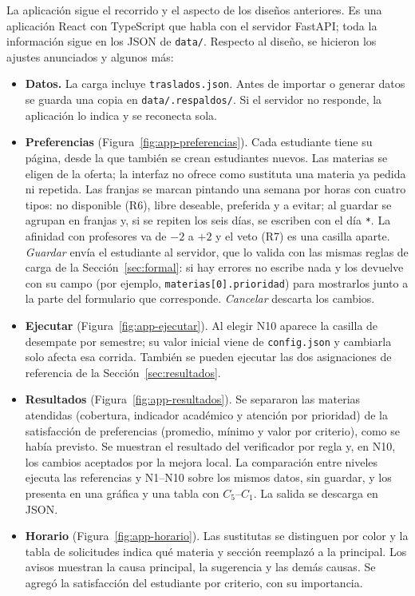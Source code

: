 La aplicación sigue el recorrido y el aspecto de los diseños anteriores. Es una aplicación React con TypeScript que habla con el servidor FastAPI; toda la información sigue en los JSON de \texttt{data/}. Respecto al diseño, se hicieron los ajustes anunciados y algunos más:
\begin{itemize}
\item \textbf{Datos.} La carga incluye \texttt{traslados.json}. Antes de importar o generar datos se guarda una copia en \texttt{data/.respaldos/}. Si el servidor no responde, la aplicación lo indica y se reconecta sola.
\item \textbf{Preferencias} (Figura~\ref{fig:app-preferencias}). Cada estudiante tiene su página, desde la que también se crean estudiantes nuevos. Las materias se eligen de la oferta; la interfaz no ofrece como sustituta una materia ya pedida ni repetida. Las franjas se marcan pintando una semana por horas con cuatro tipos: no disponible (R6), libre deseable, preferida y a evitar; al guardar se agrupan en franjas y, si se repiten los seis días, se escriben con el día \texttt{*}. La afinidad con profesores va de $-2$ a $+2$ y el veto (R7) es una casilla aparte. \emph{Guardar} envía el estudiante al servidor, que lo valida con las mismas reglas de carga de la Sección~\ref{sec:formal}: si hay errores no escribe nada y los devuelve con su campo (por ejemplo, \texttt{materias[0].prioridad}) para mostrarlos junto a la parte del formulario que corresponde. \emph{Cancelar} descarta los cambios.
\item \textbf{Ejecutar} (Figura~\ref{fig:app-ejecutar}). Al elegir N10 aparece la casilla de desempate por semestre; su valor inicial viene de \texttt{config.json} y cambiarla solo afecta esa corrida. También se pueden ejecutar las dos asignaciones de referencia de la Sección~\ref{sec:resultados}.
\item \textbf{Resultados} (Figura~\ref{fig:app-resultados}). Se separaron las materias atendidas (cobertura, indicador académico y atención por prioridad) de la satisfacción de preferencias (promedio, mínimo y valor por criterio), como se había previsto. Se muestran el resultado del verificador por regla y, en N10, los cambios aceptados por la mejora local. La comparación entre niveles ejecuta las referencias y N1--N10 sobre los mismos datos, sin guardar, y los presenta en una gráfica y una tabla con $C_5$--$C_1$. La salida se descarga en JSON.
\item \textbf{Horario} (Figura~\ref{fig:app-horario}). Las sustitutas se distinguen por color y la tabla de solicitudes indica qué materia y sección reemplazó a la principal. Los avisos muestran la causa principal, la sugerencia y las demás causas. Se agregó la satisfacción del estudiante por criterio, con su importancia.
\end{itemize}

